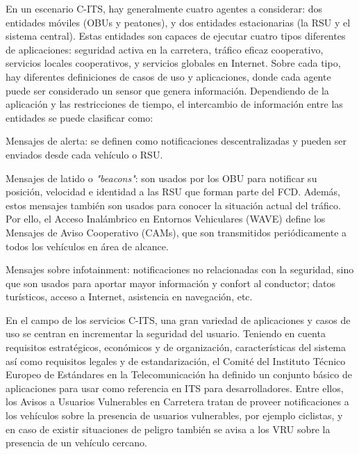 En un escenario C-ITS, hay generalmente cuatro agentes a considerar: dos entidades
móviles (OBUs y peatones), y dos entidades estacionarias (la RSU y el sistema central).
Estas entidades son capaces de ejecutar cuatro tipos diferentes de aplicaciones:
seguridad activa en la carretera, tráfico eficaz cooperativo, servicios locales
cooperativos, y servicios globales en Internet. Sobre cada tipo, hay diferentes
definiciones de casos de uso y aplicaciones, donde cada agente puede ser considerado
un sensor que genera información. Dependiendo de la aplicación y las restricciones de 
tiempo, el intercambio de información entre las entidades se puede clasificar como:
\begin{description}
	\item{Mensajes de alerta:} se definen como notificaciones descentralizadas 
	y pueden ser enviados desde cada vehículo o RSU.

	\item{Mensajes de latido o \emph{"beacons"}:} son usados por los OBU para
	notificar su posición, velocidad e identidad a las RSU que forman parte del
	FCD. Además, estos mensajes también son usados para conocer la situación
	actual del tráfico. Por ello, el Acceso Inalámbrico en Entornos Vehiculares (WAVE)
	define los Mensajes de Aviso Cooperativo (CAMs), que son transmitidos periódicamente
	a todos los vehículos en área de alcance.

	\item{Mensajes sobre infotainment}: notificaciones no relacionadas con la seguridad,
	sino que son usados para aportar mayor información y confort al conductor; datos
	turísticos, acceso a Internet, asistencia en navegación, etc.
\end{description}

En el campo de los servicios C-ITS, una gran variedad de aplicaciones y casos de uso
se centran en incrementar la seguridad del usuario. Teniendo en cuenta requisitos
estratégicos, económicos y de organización, características del sistema así como
requisitos legales y de estandarización, el Comité del Instituto Técnico Europeo de
Estándares en la Telecomunicación ha definido un conjunto básico de aplicaciones para
usar como referencia en ITS para desarrolladores. Entre ellos, los Avisos a Usuarios
Vulnerables en Carretera tratan de proveer notificaciones a los vehículos sobre la
presencia de usuarios vulnerables, por ejemplo ciclistas, y en caso de existir situaciones
de peligro también se avisa a los VRU sobre la presencia de un vehículo cercano.

